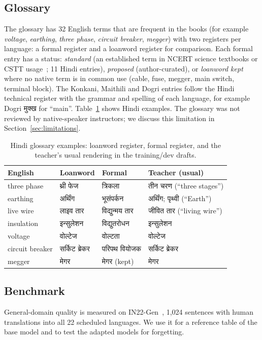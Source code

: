 \documentclass[conference]{IEEEtran}
\newcommand{\dev}[1]{{\devfont #1}}
\begin{document}
\subsection{Glossary}
The glossary has 32 English terms that are frequent in the books (for example \emph{voltage}, \emph{earthing}, \emph{three phase}, \emph{circuit breaker}, \emph{megger}) with two registers per language: a formal register and a loanword register for comparison. Each formal entry has a status: \emph{standard} (an established term in NCERT science textbooks or CSTT usage~\cite{ncert_science10,cstt}; 11 Hindi entries), \emph{proposed} (author-curated), or \emph{loanword kept} where no native term is in common use (cable, fuse, megger, main switch, terminal block). The Konkani, Maithili and Dogri entries follow the Hindi technical register with the grammar and spelling of each language, for example Dogri \dev{मुक्ख} for ``main''. Table~\ref{tab:glossary} shows Hindi examples. The glossary was not reviewed by native-speaker instructors; we discuss this limitation in Section~\ref{sec:limitations}.

\begin{table}[t]
\caption{Hindi glossary examples: loanword register, formal register, and the teacher's usual rendering in the training/dev drafts.}
\label{tab:glossary}
\centering
\footnotesize
\setlength{\tabcolsep}{3pt}
\begin{tabular}{@{}llll@{}}
\toprule
English & Loanword & Formal & Teacher (usual) \\
\midrule
three phase & \dev{थ्री फेज} & \dev{त्रिकला} & \dev{तीन चरण} (``three stages'') \\
earthing & \dev{अर्थिंग} & \dev{भूसंपर्कन} & \dev{अर्थिंग}; \dev{पृथ्वी} (``Earth'') \\
live wire & \dev{लाइव तार} & \dev{विद्युन्मय तार} & \dev{जीवित तार} (``living wire'') \\
insulation & \dev{इन्सुलेशन} & \dev{विद्युतरोधन} & \dev{इन्सुलेशन} \\
voltage & \dev{वोल्टेज} & \dev{वोल्टता} & \dev{वोल्टेज} \\
circuit breaker & \dev{सर्किट ब्रेकर} & \dev{परिपथ वियोजक} & \dev{सर्किट ब्रेकर} \\
megger & \dev{मेगर} & \dev{मेगर} (kept) & \dev{मेगर} \\
\bottomrule
\end{tabular}
\end{table}

\subsection{Benchmark}
General-domain quality is measured on IN22-Gen~\cite{gala2023indictrans2}, 1,024 sentences with human translations into all 22 scheduled languages. We use it for a reference table of the base model and to test the adapted models for forgetting.
\end{document}
